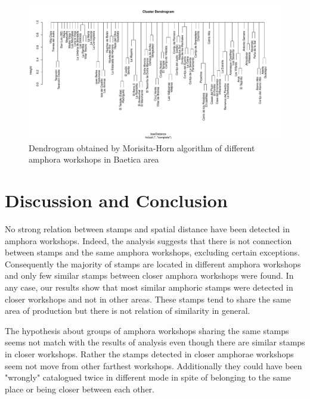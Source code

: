 \documentclass[review]{elsarticle}
\begin{document}
\begin{figure}[htp]
	\centering
\includegraphics[width=\linewidth]{figs/dendro}
\caption{Dendrogram obtained by Morisita-Horn algorithm of different amphora workshops in Baetica area}
\label{dendro}
\end{figure} 





\section{Discussion and Conclusion}


No strong relation between stamps and spatial distance have been detected in amphora workshops. Indeed, the analysis suggests that there is not connection between stamps and the same amphora workshops, excluding certain exceptions. Consequently the majority of stamps are located in different amphora workshops and only few similar stamps between closer amphora workshops were found. In any case, our results show that most similar amphoric stamps were detected in closer workshops and not in other areas. These stamps tend to share the same area of production but there is not relation of similarity in general. 

The hypothesis about groups of amphora workshops sharing the same stamps seems not match with the results of analysis even though there are similar stamps in closer workshops. Rather the stamps detected in closer amphorae workshops seem not move from other farthest workshops. Additionally they could have been "wrongly" catalogued twice in different mode in spite of belonging to the same place or being closer between each other. 
\end{document}
